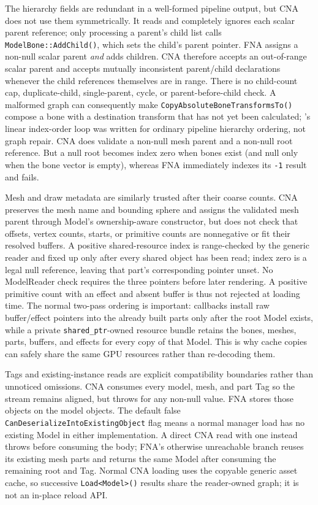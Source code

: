 The hierarchy fields are redundant in a well-formed pipeline output, but CNA does not use them
symmetrically.  It reads and completely ignores each scalar parent reference; only processing a
parent's child list calls \texttt{ModelBone::AddChild()}, which sets the child's parent pointer.
FNA assigns a non-null scalar parent \emph{and} adds children.  CNA therefore accepts an
out-of-range scalar parent and accepts mutually inconsistent parent/child declarations whenever
the child references themselves are in range.  There is no child-count cap, duplicate-child,
single-parent, cycle, or parent-before-child check.  A malformed graph can consequently make
\texttt{CopyAbsoluteBoneTransformsTo()} compose a bone with a destination transform that has not
yet been calculated; 's linear index-order loop was written for ordinary
pipeline hierarchy ordering, not graph repair.  CNA does validate a non-null mesh parent and a
non-null root reference.  But a null root becomes index zero when bones exist (and null only when
the bone vector is empty), whereas FNA immediately indexes its \texttt{-1} result and fails.

Mesh and draw metadata are similarly trusted after their coarse counts.  CNA preserves the mesh
name and bounding sphere and assigns the validated mesh parent through Model's ownership-aware
constructor, but does not check that offsets, vertex counts, starts, or primitive counts are
nonnegative or fit their resolved buffers.  A positive shared-resource index is range-checked by
the generic reader and fixed up only after every shared object has been read; index zero is a
legal null reference, leaving that part's corresponding pointer unset.  No ModelReader check
requires the three pointers before later rendering.  A positive primitive count with an effect
and absent buffer is thus not rejected at loading time.  The normal two-pass ordering is
important: callbacks install raw buffer/effect pointers into the already built parts only after
the root Model exists, while a private \texttt{shared\_ptr}-owned resource bundle retains the
bones, meshes, parts, buffers, and effects for every copy of that Model.  This is why cache copies
can safely share the same GPU resources rather than re-decoding them.

Tags and existing-instance reads are explicit compatibility boundaries rather than unnoticed
omissions.  CNA consumes every model, mesh, and part Tag so the stream remains aligned, but throws
 for any non-null value.  FNA stores those objects on the model
objects.  The default false \texttt{CanDeserializeIntoExistingObject} flag means a normal
manager load has no existing Model in either implementation.  A direct CNA read with one instead
throws before consuming the body; FNA's otherwise unreachable branch reuses its existing mesh
parts and returns the same Model after consuming the remaining root and Tag.  Normal CNA loading
uses the copyable generic asset cache, so successive \texttt{Load<Model>()} results share the
reader-owned graph; it is not an in-place reload API.

